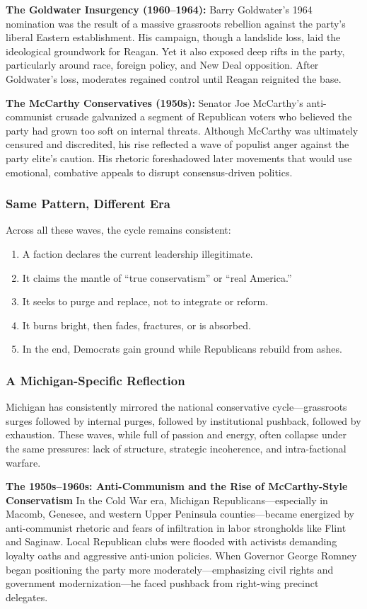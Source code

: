 \textbf{The Goldwater Insurgency (1960–1964):} Barry Goldwater’s 1964 nomination was the result of a massive grassroots rebellion against the party’s liberal Eastern establishment. His campaign, though a landslide loss, laid the ideological groundwork for Reagan. Yet it also exposed deep rifts in the party, particularly around race, foreign policy, and New Deal opposition. After Goldwater’s loss, moderates regained control until Reagan reignited the base.

\textbf{The McCarthy Conservatives (1950s):} Senator Joe McCarthy’s anti-communist crusade galvanized a segment of Republican voters who believed the party had grown too soft on internal threats. Although McCarthy was ultimately censured and discredited, his rise reflected a wave of populist anger against the party elite’s caution. His rhetoric foreshadowed later movements that would use emotional, combative appeals to disrupt consensus-driven politics.

\subsubsection{Same Pattern, Different Era}
Across all these waves, the cycle remains consistent:
\begin{enumerate}
\item A faction declares the current leadership illegitimate.
\item It claims the mantle of “true conservatism” or “real America.”
\item It seeks to purge and replace, not to integrate or reform.
\item It burns bright, then fades, fractures, or is absorbed.
\item In the end, Democrats gain ground while Republicans rebuild from ashes.
\end{enumerate}

\subsubsection{A Michigan-Specific Reflection}

Michigan has consistently mirrored the national conservative cycle—grassroots surges followed by internal purges, followed by institutional pushback, followed by exhaustion. These waves, while full of passion and energy, often collapse under the same pressures: lack of structure, strategic incoherence, and intra-factional warfare.

\textbf{The 1950s–1960s: Anti-Communism and the Rise of McCarthy-Style Conservatism}
In the Cold War era, Michigan Republicans—especially in Macomb, Genesee, and western Upper Peninsula counties—became energized by anti-communist rhetoric and fears of infiltration in labor strongholds like Flint and Saginaw. Local Republican clubs were flooded with activists demanding loyalty oaths and aggressive anti-union policies. When Governor George Romney began positioning the party more moderately—emphasizing civil rights and government modernization—he faced pushback from right-wing precinct delegates.

